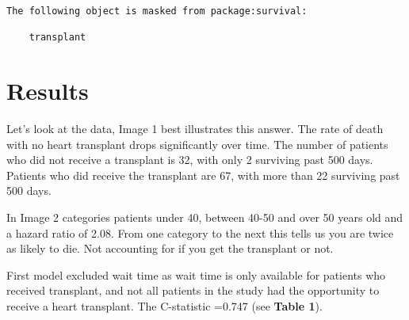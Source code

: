 \documentclass[
  letterpaper,
  DIV=11,
  numbers=noendperiod]{scrreprt}
\newenvironment{Shaded}{\begin{snugshade}}{\end{snugshade}}
\newcommand{\CommentTok}[1]{\textcolor[rgb]{0.37,0.37,0.37}{#1}}
\newcommand{\DecValTok}[1]{\textcolor[rgb]{0.68,0.00,0.00}{#1}}
\newcommand{\FunctionTok}[1]{\textcolor[rgb]{0.28,0.35,0.67}{#1}}
\newcommand{\NormalTok}[1]{\textcolor[rgb]{0.00,0.23,0.31}{#1}}
\newcommand{\OtherTok}[1]{\textcolor[rgb]{0.00,0.23,0.31}{#1}}
\newcommand{\SpecialCharTok}[1]{\textcolor[rgb]{0.37,0.37,0.37}{#1}}
\newcommand{\StringTok}[1]{\textcolor[rgb]{0.13,0.47,0.30}{#1}}
\begin{document}
\begin{Shaded}
\end{Shaded}

\begin{verbatim}
The following object is masked from package:survival:

    transplant
\end{verbatim}

\hypertarget{results}{%
\section{Results}\label{results}}

Let's look at the data, Image 1 best illustrates this answer. The rate
of death with no heart transplant drops significantly over time. The
number of patients who did not receive a transplant is 32, with only 2
surviving past 500 days. Patients who did receive the transplant are 67,
with more than 22 surviving past 500 days.~

In Image 2 categories patients under 40, between 40-50 and over 50 years
old and a hazard ratio of 2.08. From one category to the next this tells
us you are twice as likely to die. Not accounting for if you get the
transplant or not.

First model excluded wait time as wait time is only available for
patients who received transplant, and not all patients in the study had
the opportunity to receive a heart transplant. The C-statistic =0.747
(see \textbf{Table 1}).
\end{document}
